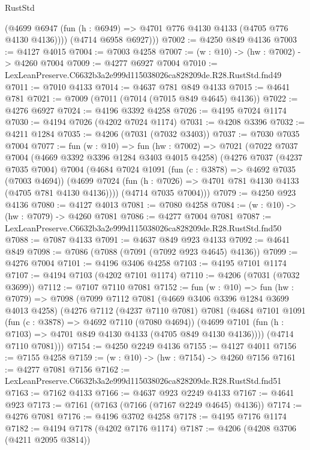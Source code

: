\begin{lexlean}{RustStd}
\begin{coremodule}
          (@4699 @6947 (fun (h : @6949) => @4701 @776 @4130 @4133 (@4705 @776 @4130 @4136))))
        (@4714 @6958 @6927)))
@7002 := @4250 @849 @4136
@7003 := @4127 @4015
@7004 := @7003 @4258
@7007 := (w : @10) -> (hw : @7002) -> @4260 @7004
@7009 := @4277 @6927 @7004
@7010 := LexLeanPreserve.C6632b3a2e999d115038026ca828209de.R28.RustStd.fnd49
@7011 := @7010 @4133
@7014 := @4637 @781 @849 @4133
@7015 := @4641 @781
@7021 := @7009 (@7011 (@7014 (@7015 @849 @4645) @4136))
@7022 := @4276 @6927
@7024 := @4196 @3392 @4258
@7026 := @4195 @7024 @1174
@7030 := @4194 @7026 (@4202 @7024 @1174)
@7031 := @4208 @3396
@7032 := @4211 @1284
@7035 := @4206 (@7031 (@7032 @3403))
@7037 := @7030 @7035 @7004
@7077 := fun (w : @10) =>
  fun (hw : @7002) =>
  @7021
    (@7022
      @7037
      @7004
      (@4669 @3392 @3396 @1284 @3403 @4015 @4258)
      (@4276
        @7037
        (@4237 @7035 @7004)
        @7004
        (@4684
          @7024
          @1091
          (fun (c : @3878) => @4692 @7035 (@7003 @4694))
          (@4699 @7024 (fun (h : @7026) => @4701 @781 @4130 @4133 (@4705 @781 @4130 @4136))))
        (@4714 @7035 @7004)))
@7079 := @4250 @923 @4136
@7080 := @4127 @4013
@7081 := @7080 @4258
@7084 := (w : @10) -> (hw : @7079) -> @4260 @7081
@7086 := @4277 @7004 @7081
@7087 := LexLeanPreserve.C6632b3a2e999d115038026ca828209de.R28.RustStd.fnd50
@7088 := @7087 @4133
@7091 := @4637 @849 @923 @4133
@7092 := @4641 @849
@7098 := @7086 (@7088 (@7091 (@7092 @923 @4645) @4136))
@7099 := @4276 @7004
@7101 := @4196 @3406 @4258
@7103 := @4195 @7101 @1174
@7107 := @4194 @7103 (@4202 @7101 @1174)
@7110 := @4206 (@7031 (@7032 @3699))
@7112 := @7107 @7110 @7081
@7152 := fun (w : @10) =>
  fun (hw : @7079) =>
  @7098
    (@7099
      @7112
      @7081
      (@4669 @3406 @3396 @1284 @3699 @4013 @4258)
      (@4276
        @7112
        (@4237 @7110 @7081)
        @7081
        (@4684
          @7101
          @1091
          (fun (c : @3878) => @4692 @7110 (@7080 @4694))
          (@4699 @7101 (fun (h : @7103) => @4701 @849 @4130 @4133 (@4705 @849 @4130 @4136))))
        (@4714 @7110 @7081)))
@7154 := @4250 @2249 @4136
@7155 := @4127 @4011
@7156 := @7155 @4258
@7159 := (w : @10) -> (hw : @7154) -> @4260 @7156
@7161 := @4277 @7081 @7156
@7162 := LexLeanPreserve.C6632b3a2e999d115038026ca828209de.R28.RustStd.fnd51
@7163 := @7162 @4133
@7166 := @4637 @923 @2249 @4133
@7167 := @4641 @923
@7173 := @7161 (@7163 (@7166 (@7167 @2249 @4645) @4136))
@7174 := @4276 @7081
@7176 := @4196 @3702 @4258
@7178 := @4195 @7176 @1174
@7182 := @4194 @7178 (@4202 @7176 @1174)
@7187 := @4206 (@4208 @3706 (@4211 @2095 @3814))

\end{coremodule}
\end{lexlean}
